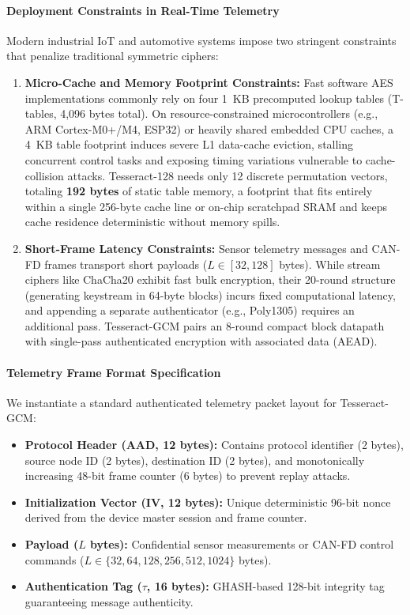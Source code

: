 \documentclass[review,12pt]{elsarticle}
\begin{document}
\paragraph{Deployment Constraints in Real-Time Telemetry}
Modern industrial IoT and automotive systems impose two stringent constraints that penalize traditional symmetric ciphers:
\begin{enumerate}
    \item \textbf{Micro-Cache and Memory Footprint Constraints:} Fast software AES implementations commonly rely on four 1~KB precomputed lookup tables (T-tables, 4,096 bytes total). On resource-constrained microcontrollers (e.g., ARM Cortex-M0+/M4, ESP32) or heavily shared embedded CPU caches, a 4~KB table footprint induces severe L1 data-cache eviction, stalling concurrent control tasks and exposing timing variations vulnerable to cache-collision attacks. Tesseract-128 needs only 12 discrete permutation vectors, totaling \textbf{192 bytes} of static table memory, a footprint that fits entirely within a single 256-byte cache line or on-chip scratchpad SRAM and keeps cache residence deterministic without memory spills.
    \item \textbf{Short-Frame Latency Constraints:} Sensor telemetry messages and CAN-FD frames transport short payloads ($L \in [32, 128]$ bytes). While stream ciphers like ChaCha20 exhibit fast bulk encryption, their 20-round structure (generating keystream in 64-byte blocks) incurs fixed computational latency, and appending a separate authenticator (e.g., Poly1305) requires an additional pass. Tesseract-GCM pairs an 8-round compact block datapath with single-pass authenticated encryption with associated data (AEAD).
\end{enumerate}

\paragraph{Telemetry Frame Format Specification}
We instantiate a standard authenticated telemetry packet layout for Tesseract-GCM:
\begin{itemize}
    \item \textbf{Protocol Header (AAD, 12 bytes):} Contains protocol identifier (2 bytes), source node ID (2 bytes), destination ID (2 bytes), and monotonically increasing 48-bit frame counter (6 bytes) to prevent replay attacks.
    \item \textbf{Initialization Vector (IV, 12 bytes):} Unique deterministic 96-bit nonce derived from the device master session and frame counter.
    \item \textbf{Payload ($L$ bytes):} Confidential sensor measurements or CAN-FD control commands ($L \in \{32, 64, 128, 256, 512, 1024\}$ bytes).
    \item \textbf{Authentication Tag ($\tau$, 16 bytes):} GHASH-based 128-bit integrity tag guaranteeing message authenticity.
\end{itemize}
\end{document}
